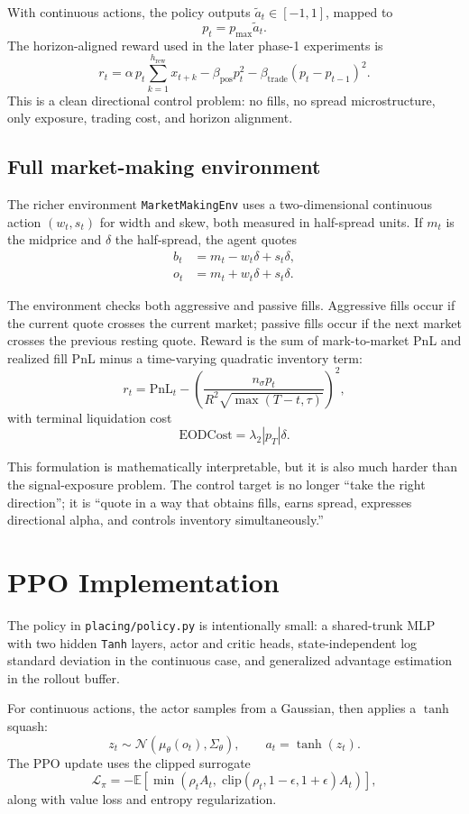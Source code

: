 \documentclass[11pt]{article}
\begin{document}
With continuous actions, the policy outputs \(\tilde{a}_t \in [-1,1]\), mapped to
\[
p_t = p_{\max} \tilde{a}_t.
\]
The horizon-aligned reward used in the later phase-1 experiments is
\[
r_t
=
\alpha\, p_t \sum_{k=1}^{h_{\mathrm{rew}}} x_{t+k}
- \beta_{\mathrm{pos}} p_t^2
- \beta_{\mathrm{trade}} (p_t - p_{t-1})^2.
\]
This is a clean directional control problem: no fills, no spread microstructure, only exposure, trading cost, and horizon alignment.

\subsection{Full market-making environment}
The richer environment \texttt{MarketMakingEnv} uses a two-dimensional continuous action \((w_t,s_t)\) for width and skew, both measured in half-spread units. If \(m_t\) is the midprice and \(\delta\) the half-spread, the agent quotes
\begin{align}
b_t &= m_t - w_t \delta + s_t \delta, \\
o_t &= m_t + w_t \delta + s_t \delta.
\end{align}

The environment checks both aggressive and passive fills. Aggressive fills occur if the current quote crosses the current market; passive fills occur if the next market crosses the previous resting quote. Reward is the sum of mark-to-market PnL and realized fill PnL minus a time-varying quadratic inventory term:
\[
r_t = \mathrm{PnL}_t - \left(\frac{n_\sigma p_t}{R^2 \sqrt{\max(T-t,\tau)}}\right)^2,
\]
with terminal liquidation cost
\[
\mathrm{EODCost} = \lambda_2 |p_T| \delta.
\]

This formulation is mathematically interpretable, but it is also much harder than the signal-exposure problem. The control target is no longer ``take the right direction''; it is ``quote in a way that obtains fills, earns spread, expresses directional alpha, and controls inventory simultaneously.''

\section{PPO Implementation}
The policy in \texttt{placing/policy.py} is intentionally small: a shared-trunk MLP with two hidden \texttt{Tanh} layers, actor and critic heads, state-independent log standard deviation in the continuous case, and generalized advantage estimation in the rollout buffer.

For continuous actions, the actor samples from a Gaussian, then applies a \(\tanh\) squash:
\[
z_t \sim \mathcal{N}(\mu_\theta(o_t), \Sigma_\theta), \qquad
a_t = \tanh(z_t).
\]
The PPO update uses the clipped surrogate
\[
\mathcal{L}_{\pi}
=
- \mathbb{E}\left[
\min\left(
\rho_t A_t,\;
\mathrm{clip}(\rho_t,1-\epsilon,1+\epsilon)A_t
\right)
\right],
\]
along with value loss and entropy regularization.
\end{document}
